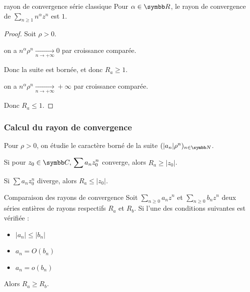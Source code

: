\begin{propositionnt}{rayon de convergence série classique}{}
    Pour $\alpha \in \R$, le rayon de convergence de $\sum_{n \geqslant 1} n^\alpha z^n$ est $1$.
\end{propositionnt}


\begin{proof}
    Soit $\rho > 0$. 

     on a $n^\alpha \rho^n \xrightarrow[n \to + \infty ]{} 0$ par croissance comparée. 

    \avspace Donc la suite est bornée, et donc $R_a \geqslant 1$.

     on a $n^\alpha \rho^n \xrightarrow[n \to + \infty ]{} +\infty$ par croissance comparée.

    \avspace Donc $R_a \leqslant 1$.
\end{proof}

\subsubsection{Calcul du rayon de convergence}


\avspace Pour $\rho > 0$, on étudie le caractère borné de la suite $(|a_n| \rho^n)_{n \in \N}$.


\avspace Si pour $z_0 \in \C, \, \displaystyle \sum a_n z_0^n$ converge, alors $R_a \geqslant |z_0|$.

Si $\sum a_n z_0^n$ diverge, alors $R_a \leqslant |z_0|$.


\begin{proposition}{Comparaison des rayons de convergence}{}
    Soit $\sum_{n \geqslant 0} a_n z^n$ et $\sum_{n \geqslant 0} b_n z^n$ deux séries entières
    de rayons respectifs $R_a$ et $R_b$. Si l'une des conditions suivantes est vérifiée :
    \begin{itemize}
        \item $|a_n| \leqslant |b_n|$
        \item $a_n = O(b_n)$
        \item $a_n = o(b_n)$
    \end{itemize}
    Alors $R_a \geqslant R_b$.
\end{proposition}

